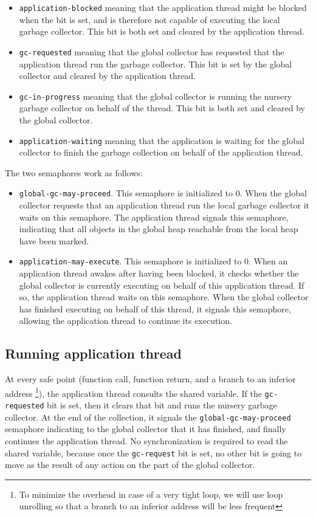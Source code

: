 \begin{itemize}
\item \texttt{application-blocked} meaning that the application thread
  might be blocked when the bit is set, and is therefore not capable
  of executing the local garbage collector.  This bit is both set and
  cleared by the application thread.
\item \texttt{gc-requested} meaning that the global collector has
  requested that the application thread run the garbage collector.
  This bit is set by the global collector and cleared by the
  application thread.
\item \texttt{gc-in-progress} meaning that the global collector is
  running the nursery garbage collector on behalf of the thread.  This
  bit is both set and cleared by the global collector.
\item \texttt{application-waiting} meaning that the application is
  waiting for the global collector to finish the garbage collection on
  behalf of the application thread.
\end{itemize}

The two semaphores work as follows:

\begin{itemize}
\item \texttt{global-gc-may-proceed}.  This semaphore is initialized to
  $0$.  When the global collector requests that an application thread
  run the local garbage collector it waits on this semaphore.  The
  application thread signals this semaphore, indicating that all
  objects in the global heap reachable from the local heap have been
  marked.
\item \texttt{application-may-execute}.  This semaphore is initialized
  to $0$.  When an application thread awakes after having been
  blocked, it checks whether the global collector is currently
  executing on behalf of this application thread.  If so, the
  application thread waits on this semaphore.  When the global
  collector has finished executing on behalf of this thread, it
  signals this semaphore, allowing the application thread to continue
  its execution.
\end{itemize}

\subsection{Running application thread}

At every safe point (function call, function return, and a branch to
an inferior address%
\footnote{To minimize the overhead in case of a very tight loop, we
  will use loop unrolling so that a branch to an inferior address will
  be less frequent}), the application thread consults the shared
variable.  If the \texttt{gc-requested} bit is set, then it clears
that bit and runs the nursery garbage collector.  At the end of the
collection, it signals the \texttt{global-gc-may-proceed} semaphore
indicating to the global collector that it has finished, and finally
continues the application thread.  No synchronization is required to
read the shared variable, because once the \texttt{gc-request} bit is
set, no other bit is going to move as the result of any action on the
part of the global collector.

